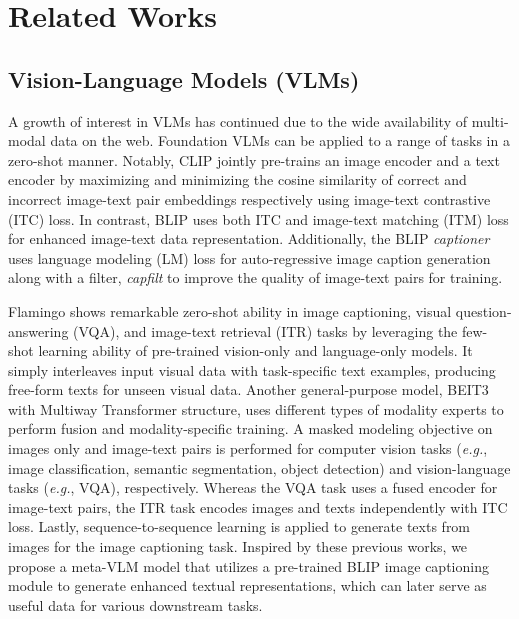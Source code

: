 \section{Related Works}
\subsection{Vision-Language Models (VLMs)}
A growth of interest in VLMs has continued due to the wide availability of multi-modal data on the web. Foundation VLMs can be applied to a range of tasks in a zero-shot manner. Notably, CLIP \cite{radford2021learning} jointly pre-trains an image encoder and a text encoder by maximizing and minimizing the cosine similarity of correct and incorrect image-text pair embeddings respectively using image-text contrastive (ITC) loss. In contrast, BLIP \cite{li2022blip} uses both ITC and image-text matching (ITM) loss for enhanced image-text data representation. Additionally, the BLIP \cite{li2022blip} \textit{captioner} uses language modeling (LM) loss for auto-regressive image caption generation along with a filter, \textit{capfilt} to improve the quality of image-text pairs for training.  

Flamingo \cite{alayrac2022flamingo} shows remarkable zero-shot ability in image captioning, visual question-answering (VQA), and image-text retrieval (ITR) tasks by leveraging the few-shot learning ability of pre-trained vision-only and language-only models. It simply interleaves input visual data with task-specific text examples, producing free-form texts for unseen visual data. Another general-purpose model, BEIT3 \cite{wang2022image} with Multiway Transformer structure, uses different types of modality experts to perform fusion and modality-specific training. A masked modeling objective on images only and image-text pairs is performed for computer vision tasks (\textit{e.g.}, image classification, semantic segmentation, object detection) and vision-language tasks (\textit{e.g.}, VQA), respectively. Whereas the VQA task uses a fused encoder for image-text pairs, the ITR task encodes images and texts independently with ITC loss. Lastly, sequence-to-sequence learning is applied to generate texts from images for the image captioning task. Inspired by these previous works, we propose a meta-VLM model that utilizes a pre-trained BLIP \cite{li2022blip} image captioning module to generate enhanced textual representations, which can later serve as useful data for various downstream tasks.

